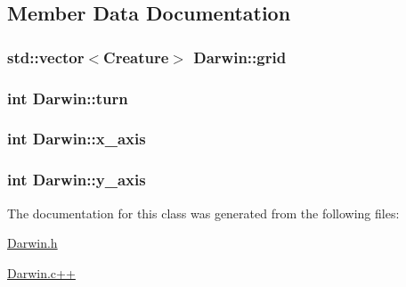 \subsection{Member Data Documentation}
\hypertarget{classDarwin_aad8346945d975c160f89deb2c62fab71}{
\subsubsection[{grid}]{\setlength{\rightskip}{0pt plus 5cm}std\-::vector$<${\bf Creature}$>$ Darwin\-::grid}}\label{classDarwin_aad8346945d975c160f89deb2c62fab71}
\hypertarget{classDarwin_a3531a1e68c4fdf8edbd6af32fb25ada0}{
\subsubsection[{turn}]{\setlength{\rightskip}{0pt plus 5cm}int Darwin\-::turn\hspace{0.3cm}{\ttfamily [private]}}}\label{classDarwin_a3531a1e68c4fdf8edbd6af32fb25ada0}
\hypertarget{classDarwin_a80597320a843e426956f743a8e334ff0}{
\subsubsection[{x\-\_\-axis}]{\setlength{\rightskip}{0pt plus 5cm}int Darwin\-::x\-\_\-axis}}\label{classDarwin_a80597320a843e426956f743a8e334ff0}
\hypertarget{classDarwin_a64648b9bd86a3797acdbd109a23278d0}{
\subsubsection[{y\-\_\-axis}]{\setlength{\rightskip}{0pt plus 5cm}int Darwin\-::y\-\_\-axis\hspace{0.3cm}{\ttfamily [private]}}}\label{classDarwin_a64648b9bd86a3797acdbd109a23278d0}


The documentation for this class was generated from the following files\-:\begin{DoxyCompactItemize}
\item 
\hyperlink{Darwin_8h}{Darwin.\-h}\item 
\hyperlink{Darwin_8c_09_09}{Darwin.\-c++}\end{DoxyCompactItemize}
